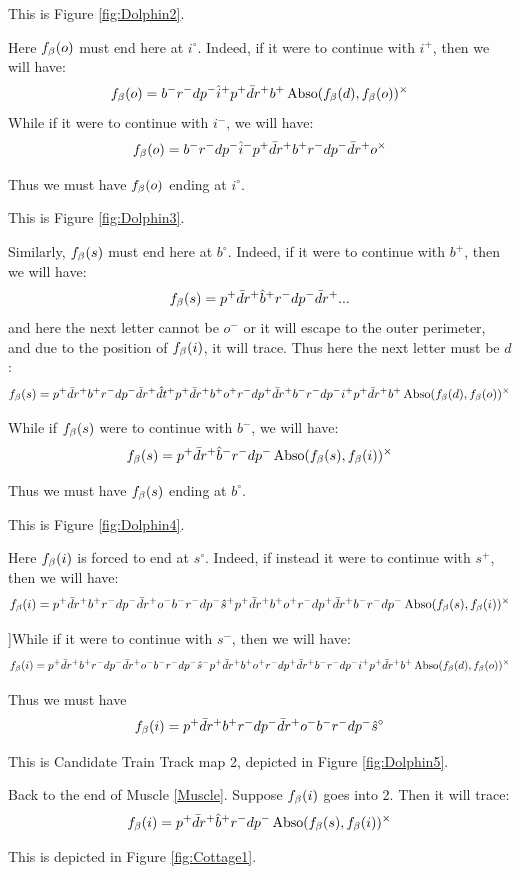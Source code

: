 This is Figure \ref{fig:Dolphin2}.

Here $f_\beta(o)$ must end here at $i^\circ$. Indeed, if it were to continue with $i^+$, then we will have:
\[
f_\beta(o) = b^- r^- d p^- \hat{i}^+ p^+ \bar{d} r^+ b^+ \operatorname{Abso}(f_\beta(d), f_\beta(o))^\times
\]
While if it were to continue with $i^-$, we will have:
\[
f_\beta(o) = b^- r^- d p^- \hat{i}^- p^+ \bar{d} r^+ b^+ r^- d p^- \bar{d} r^+ o^\times
\]

Thus we must have $f_\beta(o)$ ending at $i^\circ$.

This is Figure \ref{fig:Dolphin3}.

Similarly, $f_\beta(s)$ must end here at $b^\circ$. Indeed, if it were to continue with $b^+$, then we will have:
\[
f_\beta(s) = p^+ \bar{d} r^+ \hat{b}^+ r^- d p^-\bar{d} r^+...
\]
and here the next letter cannot be $o^-$ or it will escape to the outer perimeter, and due to the position of $f_\beta(i)$, it will trace. Thus here the next letter must be $d$:
\[
f_\beta(s) = p^+ \bar{d} r^+ b^+ r^- d p^-\bar{d} r^+ \hat{d} t^+ p^+ \bar{d} r^+ b^+ o^+ r^- d p^+ \bar{d} r^+ b^- r^- d p^- i^+ p^+\bar{d} r^+ b^+ \operatorname{Abso}(f_\beta(d), f_\beta(o))^\times
\]

While if $f_\beta(s)$ were to continue with $b^-$, we will have:
\[
f_\beta(s) = p^+ \bar{d} r^+ \hat{b}^- r^- d p^- \operatorname{Abso}(f_\beta(s), f_\beta(i))^\times
\]

Thus we must have $f_\beta(s)$ ending at $b^\circ$.

This is Figure \ref{fig:Dolphin4}.

Here $f_\beta(i)$ is forced to end at $s^\circ$. Indeed, if instead it were to continue with $s^+$, then we will have:
\[
f_\beta(i) = p^+ \bar{d} r^+ b^+ r^- d p^- \bar{d} r^+ o^- b^- r^- d p^- \hat{s}^+ p^+ \bar{d} r^+ b^+ o^+ r^- d p^+ \bar{d} r^+ b^- r^- d p^- \operatorname{Abso}(f_\beta(s), f_\beta(i))^\times
\]

]While if it were to continue with $s^-$, then we will have:
\[
f_\beta(i) = p^+ \bar{d} r^+ b^+ r^- d p^- \bar{d} r^+ o^- b^- r^- d p^- \hat{s}^- p^+ \bar{d} r^+ b^+ o^+ r^- d p^+ \bar{d} r^+ b^- r^- d p^- i^+ p^+ \bar{d} r^+ b^+ \operatorname{Abso}(f_\beta(d), f_\beta(o))^\times
\]

Thus we must have
\[
f_\beta(i) = p^+ \bar{d} r^+ b^+ r^- d p^- \bar{d} r^+ o^- b^- r^- d p^- \hat{s}^\circ
\]

This is Candidate Train Track map 2, depicted in Figure \ref{fig:Dolphin5}.

 \label{Cottage}
Back to the end of Muscle \ref{Muscle}. Suppose $f_\beta(i)$ goes into 2. Then it will trace:
\[
f_\beta(i) = p^+ \bar{d} r^+ \hat{b}^+ r^- d p^- \operatorname{Abso}(f_\beta(s), f_\beta(i))^\times
\]

This is depicted in Figure \ref{fig:Cottage1}.

